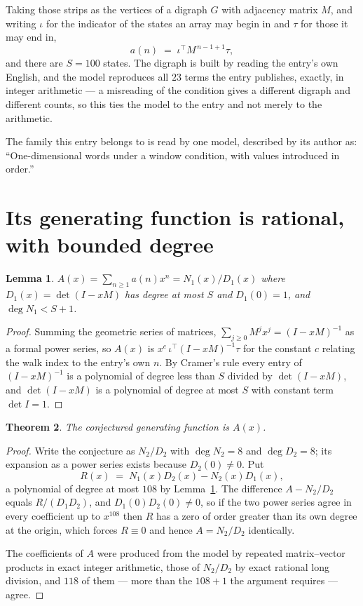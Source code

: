 \documentclass[11pt,a4paper]{article}
\theoremstyle{plain}
\newtheorem{theorem}{Theorem}
\newtheorem{lemma}[theorem]{Lemma}
\theoremstyle{definition}
\begin{document}
Taking those strips as the vertices of a digraph $G$ with adjacency matrix $M$, and writing
$\iota$ for the indicator of the states an array may begin in and $\tau$ for those it may end
in,
\[
a(n)\;=\;\iota^{\!\top}M^{\,n-1+1}\tau ,
\]
and there are $S=100$ states. The digraph is built by reading the entry's own English, and the
model reproduces all $23$ terms the entry publishes, exactly, in integer arithmetic --- a
misreading of the condition gives a different digraph and different counts, so this ties the
model to the entry and not merely to the arithmetic.

The family this entry belongs to is read by one model, described by its author as: ``One-dimensional words under a window condition, with values introduced in order.''


\section{Its generating function is rational, with bounded degree}

\begin{lemma}\label{lem:rat}
$A(x)=\sum_{n\ge1}a(n)x^n=N_1(x)/D_1(x)$ where $D_1(x)=\det(I-xM)$ has degree at most
$S$ and $D_1(0)=1$, and $\deg N_1<S+1$.
\end{lemma}

\begin{proof}
Summing the geometric series of matrices, $\sum_{j\ge0}M^jx^j=(I-xM)^{-1}$ as a formal
power series, so $A(x)$ is $x^{c}\,\iota^{\!\top}(I-xM)^{-1}\tau$ for the constant $c$
relating the walk index to the entry's own $n$. By Cramer's rule every entry of
$(I-xM)^{-1}$ is a polynomial of degree less than $S$ divided by $\det(I-xM)$, and
$\det(I-xM)$ is a polynomial of degree at most $S$ with constant term $\det I=1$.
\end{proof}

\begin{theorem}
The conjectured generating function is $A(x)$.
\end{theorem}

\begin{proof}
Write the conjecture as $N_2/D_2$ with $\deg N_2=8$ and $\deg D_2=8$; its expansion as a
power series exists because $D_2(0)\neq0$. Put
\[
R(x)\;=\;N_1(x)D_2(x)-N_2(x)D_1(x),
\]
a polynomial of degree at most $108$ by Lemma~\ref{lem:rat}. The difference
$A-N_2/D_2$ equals $R/(D_1D_2)$, and $D_1(0)D_2(0)\neq0$, so if the two power series agree in
every coefficient up to $x^{108}$ then $R$ has a zero of order greater than its own
degree at the origin, which forces $R\equiv0$ and hence $A=N_2/D_2$ identically.

The coefficients of $A$ were produced from the model by repeated matrix--vector products in
exact integer arithmetic, those of $N_2/D_2$ by exact rational long division, and $118$
of them --- more than the $108+1$ the argument requires --- agree.
\end{proof}
\end{document}
